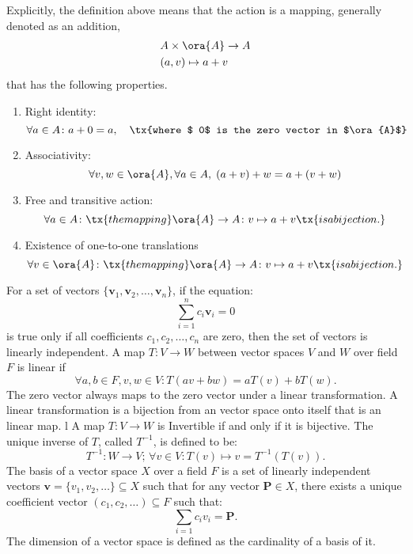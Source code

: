\documentclass[a4paper,12pt]{report}
\begin{document}
Explicitly, the definition above means that the action is a mapping, generally denoted as an addition,
\[\begin{aligned}
& A\times\ora{A}\to A\\
& (a,v)\mapsto a+v
\end{aligned}\]
that has the following properties.
\begin{enumerate}
\item Right identity: \[\forall a\in A\colon a+0=a,\quad\tx{where $ 0$ is the zero vector in $\ora{A}$}\]
\item Associativity: \[\forall v,w\in \ora{A},\forall a\in A,\;(a+v)+w=a+(v+w)\]
\item Free and transitive action: \[\forall a\in A\colon \tx{the mapping }\ora{A}\to A\colon v\mapsto a+v\tx{ is a bijection.}\]
\item Existence of one-to-one translations \[\forall v\in \ora{A} \colon \tx{the mapping }\ora{A}\to A\colon v\mapsto a+v\tx{ is a bijection.}\]
\end{enumerate}
For a set of vectors \(\{\mathbf{v}_1,\mathbf{v}_2, \dots, \mathbf{v}_n\}\), if the equation:
\[\sum_{i=1}^nc_i\mathbf{v}_i = 0 \]
is true only if all coefficients \(c_1,c_2, \dots,c_n\) are zero, then the set of vectors is linearly independent.
A map $T\colon V\to W$ between vector spaces $V$ and $W$ over field $F$ is linear if
\[\forall a,b\in F,v,w\in V\colon T(av+bw)=aT(v)+bT(w).\]
The zero vector always maps to the zero vector under a linear transformation.
A linear transformation is a bijection from an vector space onto itself that is an linear map. l
A map $T\colon V\to W$ is Invertible if and only if it is bijective. The unique inverse of $T$, called $T^{-1}$, is defined to be:
\[T^{-1}\colon W\to V;\,\forall v\in V\colon T(v)\mapsto v=T^{-1}(T(v)).\]
The basis of a vector space $X$ over a field $F$ is a set of linearly independent vectors $\mathbf{v}=\{v_1,v_2,\dots\}\subseteq X$ such that for any vector $\mathbf{P}\in X$, there exists a unique coefficient vector $(c_1,c_2, \dots)\subseteq F$ such that:
\[\sum_{i=1}c_iv_i=\mathbf{P}.\]
The dimension of a vector space is defined as the cardinality of a basis of it.
\end{document}
